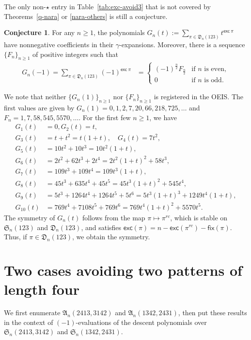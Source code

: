 \documentclass[12pt,reqno]{amsart}
\numberwithin{equation}{section}
\theoremstyle{plain}
\theoremstyle{definition}
\newtheorem{conj}[theorem]{Conjecture}
\def\S{\mathfrak{S}}
\def\D{\mathfrak{D}}
\def\A{\mathfrak{A}}
\def\exc{\mathsf{exc}}
\def\fix{\mathsf{fix}}
\begin{document}


The only non-$\star$ entry in Table~\ref{tab:exc-avoid3} that is not covered by Theorems~\ref{q-nara} or \ref{nara-others} is still a conjecture.

\begin{conj}\label{conj}
For any $n\geq 1$, the polynomials $G_n(t):=\sum\limits_{\pi\in\D_n(123)}t^{\exc\:\pi}$ have nonnegative coefficients in their $\gamma$-expansions. Moreover, there is a sequence $\{F_n\}_{n\ge 1}$ of positive integers such that
\begin{align*}
G_{n}(-1)=\sum_{\pi\in\D_n(123)}(-1)^{\exc\:\pi}&=\begin{cases}(-1)^{\frac{n}{2}}F_{\frac{n}{2}} & \textrm{if $n$ is even},\\
0 & \textrm{if $n$ is odd}.
\end{cases}
\end{align*}
\end{conj}

We note that neither $\{G_n(1)\}_{n\ge 1}$ nor $\{F_n\}_{n\ge 1}$ is registered in the OEIS. The first values are given by $G_n(1)=0, 1, 2, 7, 20, 66, 218, 725,\ldots$ and
$F_n=1, 7, 58, 545, 5570, \ldots$.
For the first few $n\geq 1$, we have
\begin{align*}
G_1(t)&=0, G_2(t)=t,\\
G_3(t)&=t+t^2=t(1+t),\quad
G_4(t)=7t^2,\\
G_5(t)&=10t^2+10t^3=10t^2(1+t),\\
G_6(t)&=2t^2+62t^3+2t^4=2t^2(1+t)^2+58t^3,\\
G_7(t)&=109t^3+109t^4=109t^3(1+t),\\
G_8(t)&=45t^3+635t^4+45t^5=45t^3(1+t)^2+545t^4,\\
G_9(t)&=5t^3+1264t^4+1264t^5+5t^6=5t^3(1+t)^3+1249t^4(1+t),\\
G_{10}(t)&=769t^4+7108t^5+769t^6=769t^4(1+t)^2+5570t^5.
\end{align*}
The symmetry of $G_n(t)$ follows from the map $\pi\mapsto \pi^{rc}$, which is stable on $\S_n(123)$ and $\D_n(123)$, and satisfies  $\exc(\pi) = n-\exc(\pi^{rc})-\fix(\pi)$. Thus, if $\pi\in \D_n(123)$, we obtain the symmetry.


\section{Two cases avoiding two patterns of length four}\label{sec6: Sch}
We first enumerate $\A_n(2413,3142)$ and $\A_n(1342,2431)$, then put these results in the context of $(-1)$-evaluations of the descent polynomials over $\S_n(2413,3142)$ and $\S_n(1342,2431)$.
\end{document}
